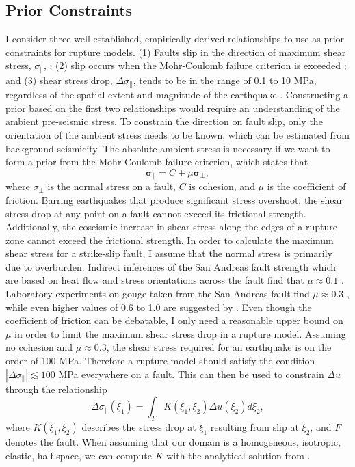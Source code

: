 \documentclass[12pt]{article}
\begin{document}
\subsection*{Prior Constraints}
I consider three well established, empirically derived relationships to use as prior constraints for rupture models. (1) Faults slip in the direction of maximum shear stress, $\sigma_\parallel$, \citep{Wallace1951}; (2) slip occurs when the Mohr-Coulomb failure criterion is exceeded \citep{Byerlee1978}; and (3) shear stress drop, $\Delta \sigma_\parallel$, tends to be in the range of 0.1 to 10 MPa, regardless of the spatial extent and magnitude of the earthquake \citep{Kanamori1975,Shearer2006}.  Constructing a prior based on the first two relationships would require an understanding of the ambient pre-seismic stress.  To constrain the direction on fault slip, only the orientation of the ambient stress needs to be known, which can be estimated from background seismicity.  The absolute ambient stress is necessary if we want to form a prior from the Mohr-Coulomb failure criterion, which states that
\begin{equation}\label{eq:MohrCoulomb}
  \mathbf{\sigma_\parallel} = C + \mu \mathbf{\sigma_\bot},
\end{equation}
where $\sigma_\bot$ is the normal stress on a fault, $C$ is cohesion, and $\mu$ is the coefficient of friction.  Barring earthquakes that produce significant stress overshoot, the shear stress drop at any point on a fault cannot exceed its frictional strength.  Additionally, the coseismic increase in shear stress along the edges of a rupture zone cannot exceed the frictional strength. In order to calculate the maximum shear stress for a strike-slip fault, I assume that the normal stress is primarily due to overburden.  Indirect inferences of the San Andreas fault strength which are based on heat flow and stress orientations across the fault find that $\mu\approx0.1$ \citep{Brune1969,Zoback1987}.  Laboratory experiments on gouge taken from the San Andreas fault find $\mu\approx0.3$ \citep{Carpenter2011}, while even higher values of 0.6 to 1.0 are suggested by \citet{Byerlee1978}. Even though the coefficient of friction can be debatable, I only need a reasonable upper bound on $\mu$ in order to limit the maximum shear stress drop in a rupture model.  Assuming no cohesion and $\mu\approx0.3$, the shear stress required for an earthquake is on the order of 100 MPa.  Therefore a rupture model should satisfy the condition $|\Delta\sigma_\parallel|\lesssim 100$ MPa everywhere on a fault.  This can then be used to constrain $\Delta u$ through the relationship
\begin{equation}\label{eq:StressSlip}
  \Delta \sigma_\parallel (\xi_1) = \int_F K(\xi_1,\xi_2) \Delta u(\xi_2) d\xi_2,
\end{equation}
where $K(\xi_1,\xi_2)$ describes the stress drop at $\xi_1$ resulting from slip at $\xi_2$, and $F$ denotes the fault.  When assuming that our domain is a homogeneous, isotropic, elastic, half-space, we can compute $K$ with the analytical solution from \citet{Okada1992}.  
\end{document}
